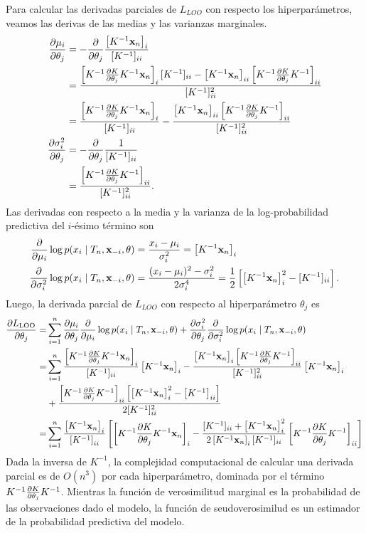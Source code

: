 Para calcular las derivadas parciales de \(L_{LOO}\) con respecto los hiperparámetros, veamos las derivas de las medias y las varianzas marginales.
\begin{align*}
	\pdv{\mu_i}{\theta_j}		&= -\pdv{\theta_j} \frac{\left[K^{-1} \mathbf{x}_n \right]_i}{[K^{-1}]_{ii}} \\
								&= \frac{\left[K^{-1} \pdv{K}{\theta_j} K^{-1} \mathbf{x}_{n}\right]_i [K^{-1}]_{ii} - \left[K^{-1} \mathbf{x}_n\right]_{ii} \left[K^{-1} \pdv{K}{\theta_j} K^{-1}\right]_{ii}}{[K^{-1}]_{ii}^2} \\
								&= \frac{\left[K^{-1} \pdv{K}{\theta_j} K^{-1} \mathbf{x}_{n}\right]_i}{[K^{-1}]_{ii}} - \frac{\left[K^{-1} \mathbf{x}_{n}\right]_{ii} \left[K^{-1} \pdv{K}{\theta_j} K^{-1}\right]_{ii}}{[K^{-1}]_{ii}^2}\\
	\pdv{\sigma_i^2}{\theta_j}	&= -\pdv{\theta_j} \frac{1}{[K^{-1}]_{ii}} \\
								&= \frac{\left[K^{-1} \pdv{K}{\theta_j} K^{-1}\right]_{ii}}{[K^{-1}]_{ii}^2}.
\end{align*}
Las derivadas con respecto a la media y la varianza de la log-probabilidad predictiva del \(i\)-ésimo término son
\begin{align*}
	\pdv{\mu_i} \log p(x_i \mid T_n, \mathbf{x}_{-i}, \theta)		&= \frac{x_i - \mu_i}{\sigma_i^2} = \left[K^{-1} \mathbf{x}_n \right]_i \\
	\pdv{\sigma_i^2}\log p(x_i \mid T_n, \mathbf{x}_{-i}, \theta)	&= \frac{(x_i - \mu_i)^2 - \sigma_i^2}{2 \sigma_i^4} = \frac{1}{2} \left[\left[K^{-1} \mathbf{x}_n\right]_i^2 - [K^{-1}]_{ii}\right].
\end{align*}
Luego, la derivada parcial de \(L_{LOO}\) con respecto al hiperparámetro \(\theta_j\) es
\begin{align*}
	\pdv{L_{\mathrm{LOO}}}{\theta_j}=	& \sum_{i=1}^{n} \pdv{\mu_i}{\theta_j} \pdv{\mu_i} \log p(x_i \mid T_n, \mathbf{x}_{-i}, \theta) + \pdv{\sigma_i^2}{\theta_j} \pdv{\sigma_i^2} \log p(x_i \mid T_n, \mathbf{x}_{-i}, \theta) \\
										=& \sum_{i=1}^{n} \frac{\left[K^{-1} \pdv{K}{\theta_j} K^{-1} \mathbf{x}_n \right]_i}{[K^{-1}]_{ii}} \left[K^{-1} \mathbf{x}_n\right]_i - \frac{\left[K^{-1} \mathbf{x}_n\right]_i \left[K^{-1} \pdv{K}{\theta_j} K^{-1}\right]_{ii}}{[K^{-1}]_{ii}^2} \left[K^{-1} \mathbf{x}_n\right]_i \\
										&+ \frac{\left[K^{-1} \pdv{K}{\theta_j} K^{-1}\right]_{ii} \left[\left[K^{-1} \mathbf{x}_n\right]_i^2 - \left[K^{-1}\right]_{ii}\right]}{2[K^{-1}]_{ii}^2} \\
										=& \sum_{i=1}^{n} \frac{\left[K^{-1} \mathbf{x}_n\right]_i}{\left[K^{-1}\right]_{ii}} \left[\left[K^{-1} \pdv{K}{\theta_j} K^{-1} \mathbf{x}_n\right]_i - \frac{[K^{-1}]_{ii} + \left[K^{-1} \mathbf{x}_n\right]_i^2}{2 \left[K^{-1} \mathbf{x}_n\right]_i[K^{-1}]_{ii}} \left[K^{-1} \pdv{K}{\theta_j} K^{-1}\right]_{ii}\right]
\end{align*}
Dada la inversa de \(K^{-1}\), la complejidad computacional de calcular una derivada parcial es de \(O(n^{3})\) por cada hiperparámetro, dominada por el término \(K^{-1} \pdv{K}{\theta_j} K^{-1}\). Mientras la función de verosimilitud marginal es la probabilidad de las observaciones dado el modelo, la función de seudoverosimilud es un estimador de la probabilidad predictiva del modelo.

